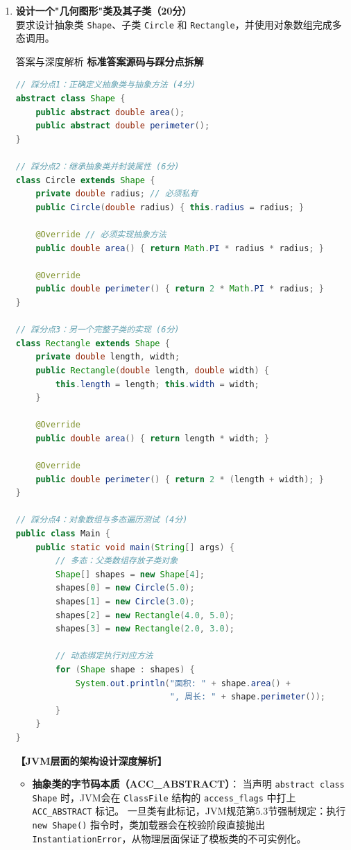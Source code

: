 \documentclass[12pt, a4paper]{ctexart}
\begin{document}
\begin{enumerate}[label=\textbf{\arabic*.}]
	\item \textbf{设计一个"几何图形"类及其子类（20分）}\\
	      要求设计抽象类 \texttt{Shape}、子类 \texttt{Circle} 和 \texttt{Rectangle}，并使用对象数组完成多态调用。

	      \begin{bluebox}{答案与深度解析}
		      \textbf{标准答案源码与踩分点拆解}

		      \begin{lstlisting}[language=Java]
// 踩分点1：正确定义抽象类与抽象方法 (4分)
abstract class Shape {
    public abstract double area();
    public abstract double perimeter();
}

// 踩分点2：继承抽象类并封装属性 (6分)
class Circle extends Shape {
    private double radius; // 必须私有
    public Circle(double radius) { this.radius = radius; }
    
    @Override // 必须实现抽象方法
    public double area() { return Math.PI * radius * radius; }
    
    @Override
    public double perimeter() { return 2 * Math.PI * radius; }
}

// 踩分点3：另一个完整子类的实现 (6分)
class Rectangle extends Shape {
    private double length, width;
    public Rectangle(double length, double width) {
        this.length = length; this.width = width;
    }
    
    @Override
    public double area() { return length * width; }
    
    @Override
    public double perimeter() { return 2 * (length + width); }
}

// 踩分点4：对象数组与多态遍历测试 (4分)
public class Main {
    public static void main(String[] args) {
        // 多态：父类数组存放子类对象
        Shape[] shapes = new Shape[4];
        shapes[0] = new Circle(5.0);
        shapes[1] = new Circle(3.0);
        shapes[2] = new Rectangle(4.0, 5.0);
        shapes[3] = new Rectangle(2.0, 3.0);
        
        // 动态绑定执行对应方法
        for (Shape shape : shapes) {
            System.out.println("面积: " + shape.area() + 
                               ", 周长: " + shape.perimeter());
        }
    }
}
\end{lstlisting}

		      \textbf{【JVM层面的架构设计深度解析】}
		      \begin{itemize}[leftmargin=*, nosep]
			      \item \textbf{抽象类的字节码本质（ACC\_ABSTRACT）}：
			            当声明 \texttt{abstract class Shape} 时，JVM会在 \texttt{ClassFile} 结构的 \texttt{access\_flags} 中打上 \texttt{ACC\_ABSTRACT} 标记。
			            一旦类有此标记，JVM规范第5.3节强制规定：执行 \texttt{new Shape()} 指令时，类加载器会在校验阶段直接抛出 \texttt{InstantiationError}，从物理层面保证了模板类的不可实例化。


\end{itemize}
\end{bluebox}
\end{enumerate}
\end{document}
